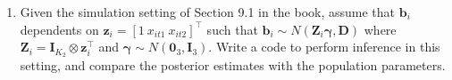 \begin{enumerate}[leftmargin=*]
\item Given the simulation setting of Section 9.1 in the book, assume that $\bm{b}_i$ dependents on $\bm{z}_i=[1 \ x_{it1} \ x_{it2}]^{\top}$ such that $\bm{b}_i\sim N(\bm{Z}_i\bm{\gamma},\bm{D})$ where $\bm{Z}_i=\bm{I}_{K_2}\otimes \bm{z}_i^{\top}$ and $\bm{\gamma}\sim N(\bm{0}_3,\bm{I}_3)$. Write a code to perform inference in this setting, and compare the posterior estimates with the population parameters.

\end{enumerate}
